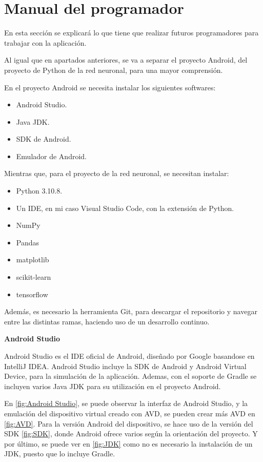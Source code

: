 \section{Manual del programador}
En esta sección se explicará lo que tiene que realizar futuros programadores para trabajar con la aplicación.

Al igual que en apartados anteriores, se va a separar el proyecto Android, del proyecto de Python de la red neuronal, para una mayor comprensión.

En el proyecto Android se necesita instalar los siguientes softwares:
\begin{itemize}
    \item Android Studio.
    \item Java JDK.
    \item SDK de Android.
    \item Emulador de Android.
\end{itemize}

Mientras que, para el proyecto de la red neuronal, se necesitan instalar:

\begin{itemize}
    \item Python 3.10.8.
    \item Un IDE, en mi caso Visual Studio Code, con la extensión de Python.
    \item NumPy
    \item Pandas
    \item matplotlib
    \item scikit-learn
    \item tensorflow
\end{itemize}

Además, es necesario la herramienta Git, para descargar el repositorio y navegar entre las distintas ramas, haciendo uso de un desarrollo continuo.

\textbf{Android Studio}

Android Studio es el IDE oficial de Android, diseñado por Google basandose en IntelliJ IDEA. Android Studio incluye la SDK de Android y Android Virtual Device, para la simulación de la aplicación. Ademas, con el soporte de Gradle se incluyen varios Java JDK para su utilización en el proyecto Android. 

En \ref{fig:Android Studio}, se puede observar la interfaz de Android Studio, y la emulación del dispositivo virtual creado con AVD, se pueden crear más AVD en \ref{fig:AVD}. Para la versión Android del dispositivo, se hace uso de la versión del SDK \ref{fig:SDK}, donde Android ofrece varios según la orientación del proyecto. Y por último, se puede ver en \ref{fig:JDK} como no es necesario la instalación de un JDK, puesto que lo incluye Gradle.


